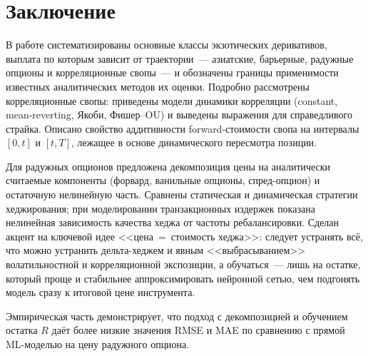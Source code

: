 \chapter*{Заключение}

В работе систематизированы основные классы экзотических деривативов,
выплата по которым зависит от траектории~--- азиатские, барьерные,
радужные опционы и корреляционные свопы~--- и обозначены границы
применимости известных аналитических методов их оценки. Подробно
рассмотрены корреляционные свопы: приведены модели динамики
корреляции (constant, mean-reverting, Якоби, Фишер--OU) и выведены
выражения для справедливого страйка. Описано свойство аддитивности
forward-стоимости свопа на интервалы $[0,t]$ и $[t,T]$, лежащее в
основе динамического пересмотра позиции.

Для радужных опционов предложена декомпозиция цены на аналитически
считаемые компоненты (форвард, ванильные опционы, спред-опцион) и
оста\-точную нелинейную часть. Сравнены статическая и динамическая
стратегии хеджирования; при моделировании транзакционных издержек
показана нелинейная зависимость качества хеджа от частоты
ребалансировки. Сделан акцент на ключевой идее <<цена~=~стоимость
хеджа>>: следует устранять всё, что можно устранить дельта-хеджем и
явным <<выбрасыванием>> волатильностной и корреляционной экспозиции, а
обучаться~--- лишь на остатке, который проще и стабильнее
аппроксимировать нейронной сетью, чем подгонять модель сразу
к итоговой цене инструмента.

Эмпирическая часть демонстрирует, что подход с декомпозицией и
обучением остатка $R$ даёт более низкие значения RMSE и MAE по
сравнению с прямой ML-моделью на цену радужного опциона.


\newpage
